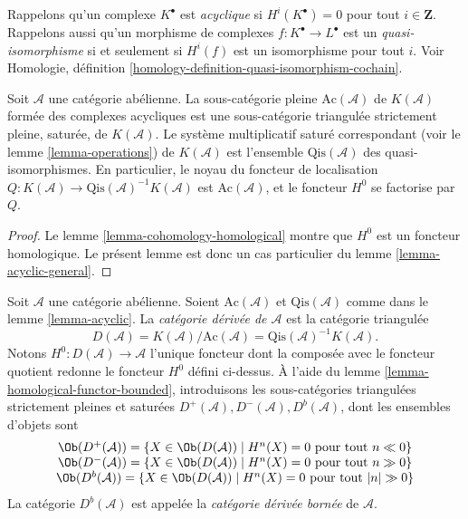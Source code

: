 \medskip\noindent
Rappelons qu'un complexe $K^\bullet$ est {\it acyclique} si
$H^i(K^\bullet) = 0$ pour tout $i \in \mathbf{Z}$. Rappelons aussi qu'un
morphisme de complexes $f : K^\bullet \to L^\bullet$ est un
{\it quasi-isomorphisme} si et seulement si $H^i(f)$ est un isomorphisme pour
tout $i$. Voir Homologie, définition
\ref{homology-definition-quasi-isomorphism-cochain}.

\begin{lemma}
\label{lemma-acyclic}
Soit $\mathcal{A}$ une catégorie abélienne. La sous-catégorie pleine
$\text{Ac}(\mathcal{A})$ de $K(\mathcal{A})$ formée des complexes acycliques
est une sous-catégorie triangulée strictement pleine, saturée, de
$K(\mathcal{A})$. Le système multiplicatif saturé correspondant (voir le
lemme \ref{lemma-operations}) de $K(\mathcal{A})$ est l'ensemble
$\text{Qis}(\mathcal{A})$ des quasi-isomorphismes. En particulier, le noyau du
foncteur de localisation
$Q : K(\mathcal{A}) \to \text{Qis}(\mathcal{A})^{-1}K(\mathcal{A})$ est
$\text{Ac}(\mathcal{A})$, et le foncteur $H^0$ se factorise par $Q$.
\end{lemma}

\begin{proof}
Le lemme \ref{lemma-cohomology-homological} montre que $H^0$ est un foncteur
homologique. Le présent lemme est donc un cas particulier du
lemme \ref{lemma-acyclic-general}.
\end{proof}

\begin{definition}
\label{definition-unbounded-derived-category}
Soit $\mathcal{A}$ une catégorie abélienne. Soient
$\text{Ac}(\mathcal{A})$ et $\text{Qis}(\mathcal{A})$ comme dans le
lemme \ref{lemma-acyclic}. La {\it catégorie dérivée de $\mathcal{A}$} est la
catégorie triangulée
$$
D(\mathcal{A}) =
K(\mathcal{A})/\text{Ac}(\mathcal{A}) =
\text{Qis}(\mathcal{A})^{-1} K(\mathcal{A}).
$$
Notons $H^0 : D(\mathcal{A}) \to \mathcal{A}$ l'unique foncteur dont la
composée avec le foncteur quotient redonne le foncteur $H^0$ défini ci-dessus.
À l'aide du lemme \ref{lemma-homological-functor-bounded}, introduisons les
sous-catégories triangulées strictement pleines et saturées
$D^{+}(\mathcal{A}), D^{-}(\mathcal{A}), D^b(\mathcal{A})$, dont les ensembles
d'objets sont
$$
\begin{matrix}
\Ob(D^{+}(\mathcal{A})) =
\{X \in \Ob(D(\mathcal{A})) \mid
H^n(X) = 0\text{ pour tout }n \ll 0\} \\
\Ob(D^{-}(\mathcal{A})) =
\{X \in \Ob(D(\mathcal{A})) \mid
H^n(X) = 0\text{ pour tout }n \gg 0\} \\
\Ob(D^b(\mathcal{A})) =
\{X \in \Ob(D(\mathcal{A})) \mid
H^n(X) = 0\text{ pour tout }|n| \gg 0\}
\end{matrix}
$$
La catégorie $D^b(\mathcal{A})$ est appelée la {\it catégorie dérivée bornée}
de $\mathcal{A}$.
\end{definition}

